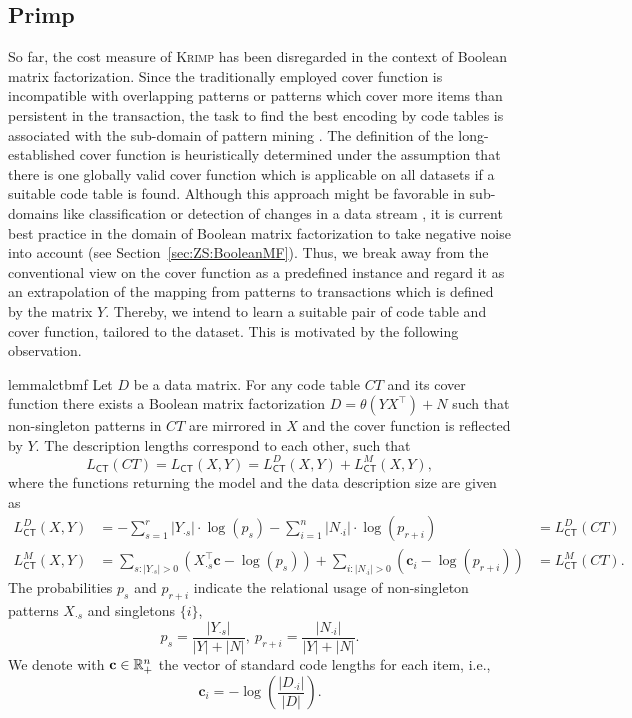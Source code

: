 \subsection{Primp}\label{sec:MDL:primp}
So far, the cost measure of \textsc{Krimp} has been disregarded in the context of Boolean matrix factorization. Since the traditionally employed cover function is incompatible with overlapping patterns or patterns which cover more items than persistent in the transaction, the task to find the best encoding by code tables is associated with the sub-domain of pattern mining \citep{miettinen2014mdl4bmf,lucchese2014unifying,karaev2015getting}. The definition of the long-established cover function is heuristically determined under the assumption that there is one globally valid cover function which is applicable on all datasets if a suitable code table is found. Although this approach might be favorable in sub-domains like classification or detection of changes in a data stream \citep{vreeken2011krimp,van2008streamkrimp}, it is current best practice in the domain of Boolean matrix factorization to take negative noise into account (see Section~\ref{sec:ZS:BooleanMF}).  
Thus, we break away from the conventional view on the cover function as a predefined instance and regard it as an extrapolation of the mapping from patterns to transactions which is defined by the matrix $Y$. Thereby, we intend to learn a suitable pair of code table and cover function, tailored to the dataset. This is motivated by the following observation.
\begin{restatable}{lemma}{lctbmf}\label{thm:CTBMF}
Let $D$ be a data matrix. For any code table $CT$ and its cover function there exists a Boolean matrix factorization $D=\theta(YX^\top )+N$ such that non-singleton patterns in $CT$ are mirrored in $X$ and the cover function is reflected by $Y$. The description lengths correspond to each other, such that 
\[L_{\mathsf{CT}}(CT)=L_{\mathsf{CT}}(X,Y)=L_{\mathsf{CT}}^D(X,Y)+L_{\mathsf{CT}}^M(X,Y),\]
where the functions returning the model and the data description size are given as  
\begin{align*}
	L_{\mathsf{CT}}^D(X,Y)&=-\sum_{s=1}^r |Y_{\cdot s}| \cdot \log(p_s)
       -\sum_{i=1}^n |N_{\cdot i}| \cdot \log(p_{r+i})
       &=L^D_{\mathsf{CT}}(CT)\\
    L_{\mathsf{CT}}^M(X,Y)
    &=\sum_{s:|Y_{\cdot s}|> 0}\left(X_{\cdot s}^\top \mathbf{c}-\log(p_s)\right)
	+\sum_{i:|N_{\cdot i}|> 0}\left(\mathbf{c}_i-\log(p_{r+i})\right)&=L_{\mathsf{CT}}^M(CT).
\end{align*}
The probabilities $p_s$ and $p_{r+i}$ indicate the relational usage of non-singleton patterns $X_{\cdot s}$ and singletons $\{i\}$,
\[
	p_s = \frac{|Y_{\cdot s}|}{|Y|+|N|},\  p_{r+i} = \frac{|N_{\cdot i}|}{|Y|+|N|}.
\]
We denote with $\mathbf{c}\in\mathbb{R}_+^n$ the vector of standard code lengths for each item, i.e., 
\[\mathbf{c}_i=-\log\left(\frac{|D_{\cdot i}|}{|D|}\right).\]
\end{restatable}
